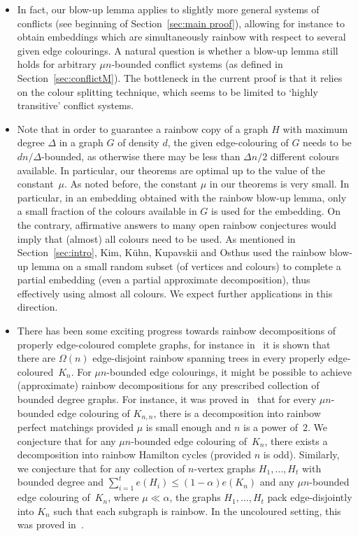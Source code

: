 \documentclass[10pt]{amsart}
\theoremstyle{definition}
\theoremstyle{claimstyle}
\theoremstyle{stepstyle}
\numberwithin{equation}{section}
\begin{document}
\begin{itemize}
\item In fact, our blow-up lemma applies to slightly more general systems of conflicts (see beginning of Section~\ref{sec:main proof}), allowing for instance to obtain embeddings which are simultaneously rainbow with respect to several given edge colourings. A natural question is whether a blow-up lemma still holds for arbitrary $\mu n$-bounded conflict systems (as defined in Section~\ref{sec:conflictM}). The bottleneck in the current proof is that it relies on the colour splitting technique, which seems to be limited to `highly transitive' conflict systems.

\item Note that in order to guarantee a rainbow copy of a graph $H$ with maximum degree $\Delta$ in a graph $G$ of density $d$, 
the given edge-colouring of $G$ needs to be $dn/\Delta $-bounded, 
as otherwise there may be less than $\Delta n/2$ different colours available.
In particular, our theorems are optimal up to the value of the constant~$\mu$.
As noted before, the constant $\mu$ in our theorems is very small. 
In particular, in an embedding obtained with the rainbow blow-up lemma, only a small fraction of the colours available in $G$ is used for the embedding. 
On the contrary, affirmative answers to many open rainbow conjectures would imply that (almost) all colours need to be used. 
As mentioned in Section~\ref{sec:intro}, 
Kim, K\"uhn, Kupavskii and Osthus
used the rainbow blow-up lemma on a small random subset (of vertices and colours) to complete a partial embedding (even a partial approximate decomposition), thus effectively using almost all colours.
We expect further applications in this direction.

\item There has been some exciting progress towards rainbow decompositions of properly edge-coloured complete graphs, for instance in~\cite{BLM:17,PS:17} it is shown that there are $\Omega(n)$ edge-disjoint rainbow spanning trees in every properly edge-coloured~$K_n$. For $\mu n$-bounded edge colourings, it might be possible to achieve (approximate) rainbow decompositions for any prescribed collection of bounded degree graphs.
For instance, it was proved in~\cite{AST:95}
that for every $\mu n$-bounded edge colouring of $K_{n,n}$,
there is a decomposition into rainbow perfect matchings provided $\mu$ is small enough and $n$ is a power of~$2$.
We conjecture that for any $\mu n$-bounded edge colouring of~$K_n$, there exists a decomposition into rainbow Hamilton cycles (provided $n$ is odd). Similarly, 
we conjecture that for any collection of $n$-vertex graphs $H_1,\dots,H_t$ with bounded degree and $\sum_{i=1}^t e(H_i) \le (1-\alpha)e(K_n)$ and any $\mu n$-bounded edge colouring of~$K_n$, where $\mu \ll \alpha$, the graphs $H_1,\dots,H_t$ pack edge-disjointly into $K_n$ such that each subgraph is rainbow. In the uncoloured setting, this was proved in~\cite{KKOT:ta}.

\end{itemize}
\end{document}

